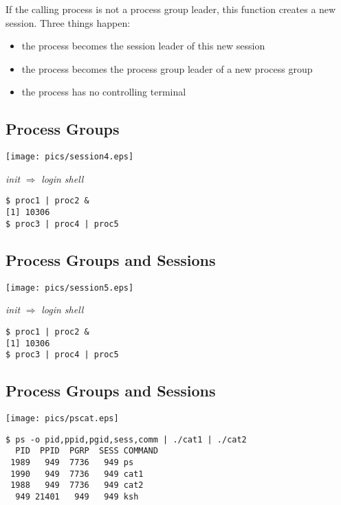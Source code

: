 \documentclass[xga]{xdvislides}
\begin{document}
If the calling process is not a process group leader, this
function creates a new session.  Three things happen:
\begin{itemize}
	\item the process becomes the session leader of this new session
	\item the process becomes the process group leader of a new process group
	\item the process has no controlling terminal
\end{itemize}

\subsection{Process Groups}
\begin{center}
	\texttt{[image: pics/session4.eps]}
\end{center}

{\em init} $\Rightarrow$ {\em login shell}
\begin{verbatim}
$ proc1 | proc2 &
[1] 10306
$ proc3 | proc4 | proc5

\end{verbatim}

\subsection{Process Groups and Sessions}
\begin{center}
	\texttt{[image: pics/session5.eps]}
\end{center}

{\em init} $\Rightarrow$ {\em login shell}
\begin{verbatim}
$ proc1 | proc2 &
[1] 10306
$ proc3 | proc4 | proc5
\end{verbatim}


\subsection{Process Groups and Sessions}
\begin{center}
	\texttt{[image: pics/pscat.eps]}
\end{center}
\begin{verbatim}
$ ps -o pid,ppid,pgid,sess,comm | ./cat1 | ./cat2
  PID  PPID  PGRP  SESS COMMAND
 1989   949  7736   949 ps
 1990   949  7736   949 cat1
 1988   949  7736   949 cat2
  949 21401   949   949 ksh
\end{verbatim}
\end{document}
